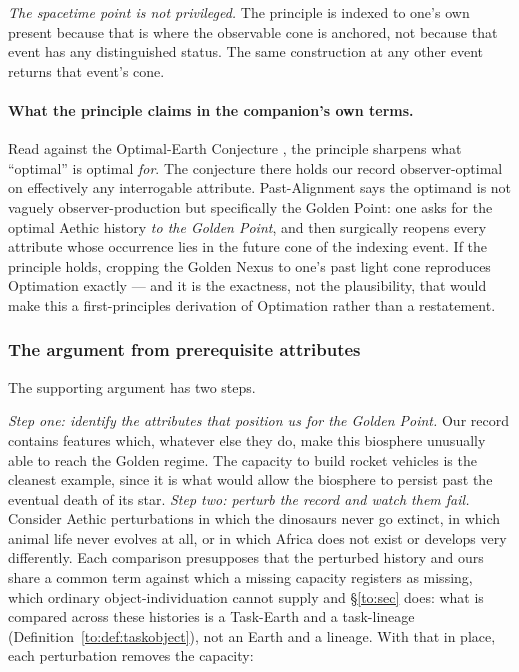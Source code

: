 \documentclass[11pt]{article}
\numberwithin{equation}{section}
\theoremstyle{plain}
\theoremstyle{definition}
\theoremstyle{remark}
\begin{document}
\emph{The spacetime point is not privileged.} The principle is indexed
to one's own present because that is where the observable cone is
anchored, not because that event has any distinguished status. The same
construction at any other event returns that event's cone.

\paragraph{What the principle claims in the companion's own terms.}\label{gc:rem:oec}
Read against the Optimal-Earth Conjecture \cite{Ben26Optimal}, the
principle sharpens what ``optimal'' is optimal \emph{for}. The
conjecture there holds our record observer-optimal on effectively any
interrogable attribute. Past-Alignment says the optimand is not
vaguely observer-production but specifically the Golden Point: one asks
for the optimal Aethic history \emph{to the Golden Point}, and then
surgically reopens every attribute whose occurrence lies in the future
cone of the indexing event. If the principle holds, cropping the Golden
Nexus to one's past light cone reproduces Optimation exactly --- and it
is the exactness, not the plausibility, that would make this a
first-principles derivation of Optimation rather than a restatement.

\subsubsection{The argument from prerequisite attributes}
\label{gc:subsub:pastalign-argument}

The supporting argument has two steps.

\emph{Step one: identify the attributes that position us for the Golden
Point.} Our record contains features which, whatever else they do, make
this biosphere unusually able to reach the Golden regime. The capacity
to build rocket vehicles is the cleanest example, since it is what would
allow the biosphere to persist past the eventual death of its star. \emph{Step two: perturb the record and watch them fail.} Consider
Aethic perturbations in which the dinosaurs never go extinct, in which
animal life never evolves at all, or in which Africa does not exist or
develops very differently. Each comparison presupposes that the
perturbed history and ours share a common term against which a missing
capacity registers as missing, which ordinary object-individuation
cannot supply and \S\ref{to:sec} does: what is compared across these
histories is a Task-Earth and a task-lineage
(Definition~\ref{to:def:taskobject}), not an Earth and a lineage. With
that in place, each perturbation removes the capacity:
\end{document}
